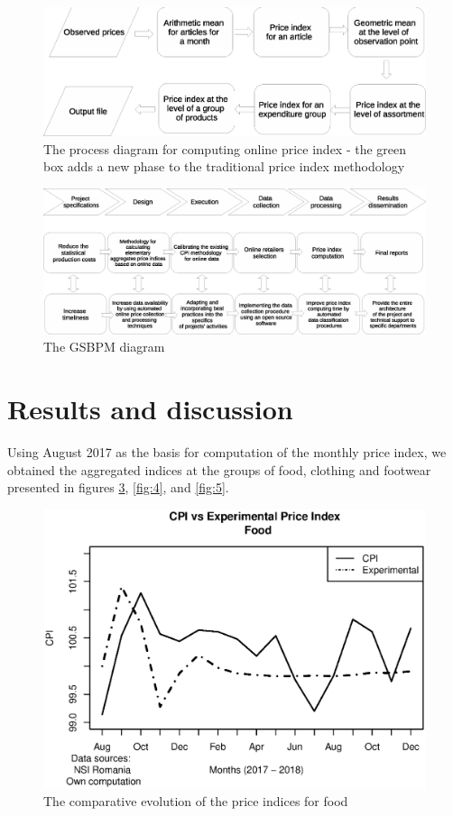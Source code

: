 \documentclass[]{article}
\begin{document}
\begin{figure}
\centering
\includegraphics[width=0.8\linewidth]{fig1.eps}
\caption{The process diagram for computing online price index - the green box adds a new phase to the traditional price index methodology}
\label{fig:1}
\end{figure}


\begin{figure}
\centering
\includegraphics[width=1\linewidth]{fig2.eps}
\caption{The GSBPM diagram}
\label{fig:2}
\end{figure}



\section{Results and discussion } \label{results}

Using August 2017 as the basis for computation of the monthly price index, we obtained the aggregated indices at the 
groups of food, clothing and footwear presented in figures \ref{fig:3}, \ref{fig:4}, and \ref{fig:5}.


\begin{figure}
\centering
\includegraphics[width=0.7\linewidth]{fig3.eps}
\caption{The comparative evolution of the price indices for food}
\label{fig:3}
\end{figure}
\end{document}
